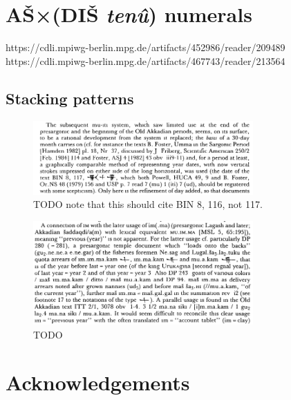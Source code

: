 \documentclass[10pt, a4paper, twoside]{article}
\begin{document}
\section{AŠ×(DIŠ \emph{tenû}) numerals}

https://cdli.mpiwg-berlin.mpg.de/artifacts/452986/reader/209489
https://cdli.mpiwg-berlin.mpg.de/artifacts/467743/reader/213564

\subsection{Stacking patterns}

\begin{figure}[H]
  \begin{center}
  \includegraphics[width=0.75\textwidth]{eng88-p144-n17.png}
  \caption{TODO note that this should cite BIN 8, 116, not 117.}
  \end{center}
\end{figure}
\begin{figure}[H]
  \begin{center}
  \includegraphics[width=0.75\textwidth]{eng88-p166-n37.png}
  \caption{TODO}
  \end{center}
\end{figure}

\section*{Acknowledgements}
\end{document}
